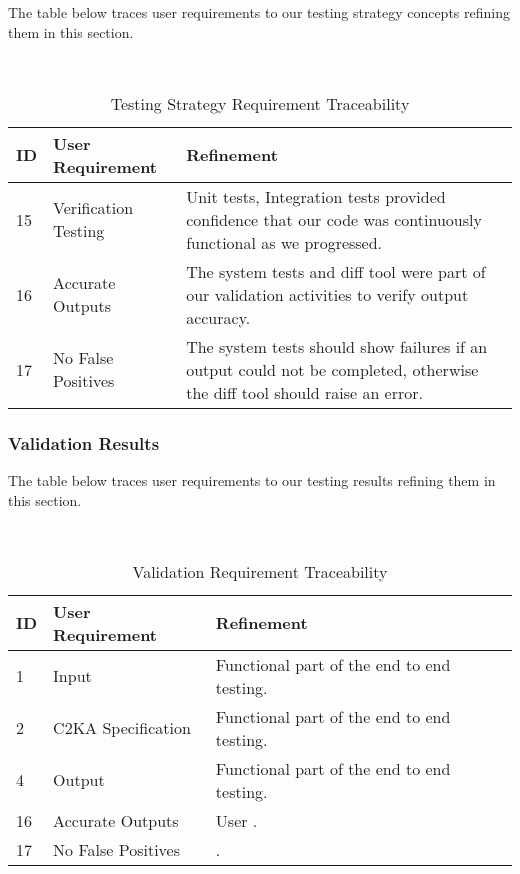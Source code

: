 \documentclass[11pt]{article}
\begin{document}

    The table below traces user requirements to our testing strategy concepts refining them in this section.
    \begin{table}[htbp]
        \centering
        \caption{Testing Strategy Requirement Traceability}\label{tab:test-strat-table}\\
        \begin{tabularx}{\textwidth}{| l | l | X |}
            \hline
            \textbf{ID} & \textbf{User Requirement} & \textbf{Refinement} \\
            \hline
            15 & Verification Testing & Unit tests, Integration tests provided confidence that our code was continuously functional as we progressed. \\ \hline
            16 & Accurate Outputs & The system tests and diff tool were part of our validation activities to verify output accuracy. \\ \hline
            17 & No False Positives & The system tests should show failures if an output could not be completed, otherwise the diff tool should raise an error. \\ \hline
        \end{tabularx}
    \end{table}
    \newpage
    \subsubsection{Validation Results}\label{subsubsec:test-validation}

    The table below traces user requirements to our testing results refining them in this section.
    \begin{table}[htbp]
        \centering
        \caption{Validation Requirement Traceability}\label{tab:test-res-table}\\
        \begin{tabularx}{\textwidth}{| l | l | X |}
            \hline
            \textbf{ID} & \textbf{User Requirement} & \textbf{Refinement} \\
            \hline
            1 & Input & Functional part of the end to end testing. \\ \hline
            2 & C2KA Specification & Functional part of the end to end testing.\\ \hline
            4 & Output & Functional part of the end to end testing.\\ \hline
            16 & Accurate Outputs & User . \\ \hline %
            17 & No False Positives & . \\ \hline %
        \end{tabularx}
    \end{table}
\end{document}
